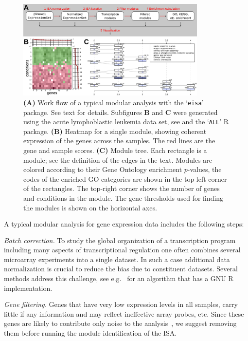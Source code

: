 \documentclass{bioinfo}
\newcommand{\Rpackage}[1]{`\texttt{#1}'}
\newcommand{\subfig}[1]{\textbf{#1}}
\begin{document}
\begin{figure}
\centering
\includegraphics[width=0.842\textwidth]{isa2workflow3}
\caption{\subfig{(A)} Work flow of a typical modular analysis with the
  \Rpackage{eisa} package. See text for details.
  Subfigures \subfig{B} and \subfig{C} were generated
  using the acute lymphoblastic leukemia data set, see
  \citep{chiaretti04} and the \Rpackage{ALL} R package.
  \subfig{(B)} Heatmap for a single module, showing coherent
  expression of the genes across the samples. The red lines are the gene and
  sample scores.
  \subfig{(C)} Module tree. Each rectangle is a module; see the
  definition of the edges in the text. Modules are colored
  according to their Gene Ontology enrichment $p$-values, the codes of
  the enriched GO categories are shown in the top-left corner of the
  rectangles. The top-right corner shows the number of genes and
  conditions in the module. The gene thresholds used for finding
  the modules is shown on the horizontal axes.
}
\label{fig:workflow}
\end{figure}

A typical modular analysis for gene expression data includes the following
steps:

\emph{Batch correction.}
To study the global organization of a transcription program including
many aspects of transcriptional regulation one often combines several
microarray experiments into a single dataset. In such a case
additional data normalization is crucial to reduce the bias due to
constituent datasets. Several methods address this challenge,
see e.g.~\citep{johnson07} for an algorithm that has a GNU R
implementation.

\emph{Gene filtering.}
Genes that have very low expression levels in all samples, carry little if
any information and may reflect ineffective array probes, etc. Since these
genes are likely to contribute only noise to the
analysis~\citep{hackstadt09}, we suggest removing them before running
the module identification of the ISA.
\end{document}
